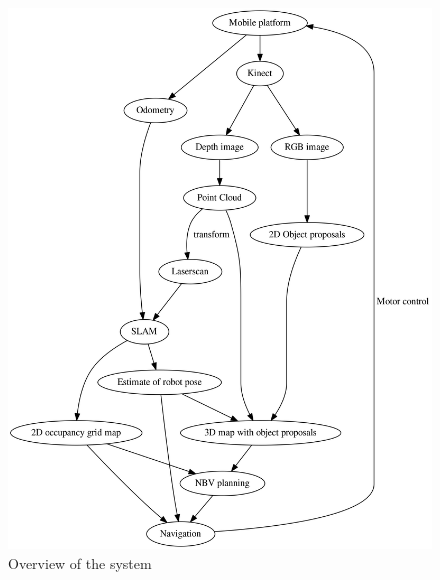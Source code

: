 \documentclass[a4paper,11pt,english]{article}
\begin{document}
\begin{figure}
	\begin{center}
		\includegraphics[width=1\linewidth]{dot/overview.png} 
		\caption{Overview of the system}
		\label{fig:overview}
	\end{center}
\end{figure}
\end{document}
